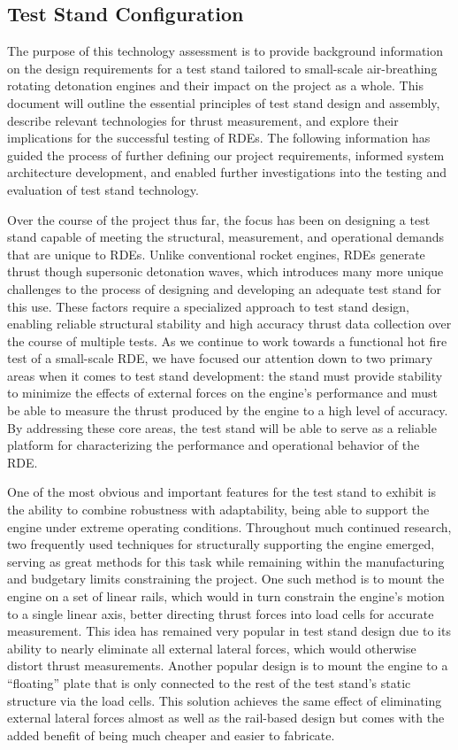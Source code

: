 \subsection{Test Stand Configuration}

The purpose of this technology assessment is to provide background information on the design requirements for a test stand tailored to small-scale air-breathing rotating detonation engines and their impact on the project as a whole. This document will outline the essential principles of test stand design and assembly, describe relevant technologies for thrust measurement, and explore their implications for the successful testing of RDEs. The following information has guided the process of further defining our project requirements, informed system architecture development, and enabled further investigations into the testing and evaluation of test stand technology.

Over the course of the project thus far, the focus has been on designing a test stand capable of meeting the structural, measurement, and operational demands that are unique to RDEs. Unlike conventional rocket engines, RDEs generate thrust though supersonic detonation waves, which introduces many more unique challenges to the process of designing and developing an adequate test stand for this use. These factors require a specialized approach to test stand design, enabling reliable structural stability and high accuracy thrust data collection over the course of multiple tests. As we continue to work towards a functional hot fire test of a small-scale RDE, we have focused our attention down to two primary areas when it comes to test stand development: the stand must provide stability to minimize the effects of external forces on the engine’s performance and must be able to measure the thrust produced by the engine to a high level of accuracy. By addressing these core areas, the test stand will be able to serve as a reliable platform for characterizing the performance and operational behavior of the RDE.

One of the most obvious and important features for the test stand to exhibit is the ability to combine robustness with adaptability, being able to support the engine under extreme operating conditions. Throughout much continued research, two frequently used techniques for structurally supporting the engine emerged, serving as great methods for this task while remaining within the manufacturing and budgetary limits constraining the project. One such method is to mount the engine on a set of linear rails, which would in turn constrain the engine’s motion to a single linear axis, better directing thrust forces into load cells for accurate measurement. This idea has remained very popular in test stand design due to its ability to nearly eliminate all external lateral forces, which would otherwise distort thrust measurements. Another popular design is to mount the engine to a “floating” plate that is only connected to the rest of the test stand’s static structure via the load cells. This solution achieves the same effect of eliminating external lateral forces almost as well as the rail-based design but comes with the added benefit of being much cheaper and easier to fabricate.

